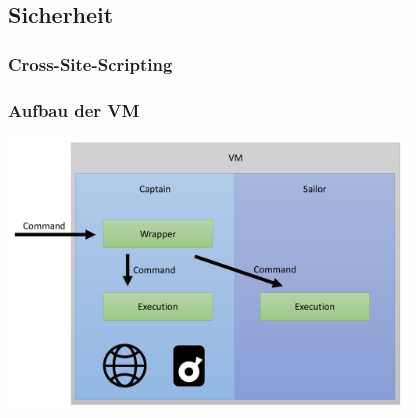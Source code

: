 \subsection{Sicherheit}

\begin{frame}
\frametitle{Cross-Site-Scripting}
\end{frame}

\begin{frame}
\frametitle{Aufbau der VM}
\includegraphics[width=300pt]{security/user.pdf}
\end{frame}